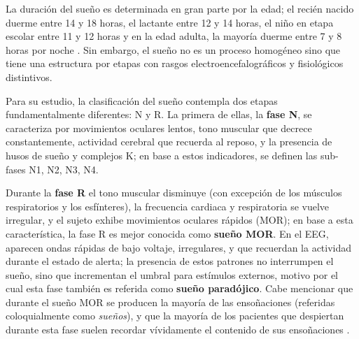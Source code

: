 La duración del sueño es determinada en gran parte por la edad; el recién nacido duerme entre 14 y 
18 horas, el lactante entre 12 y 14 horas, el niño en etapa escolar entre 11 y 12 horas y en la 
edad adulta, la mayoría duerme entre 7 y 8 horas por noche \cite{Contreras13}.
Sin embargo, el sueño no es un proceso homogéneo sino que tiene una estructura 
por etapas con rasgos electroencefalográficos y fisiológicos distintivos.

Para su estudio, la clasificación del sueño 
contempla dos etapas fundamentalmente diferentes: N y R.
La primera de ellas, la \textbf{fase N}, se caracteriza por movimientos oculares lentos, tono 
muscular que decrece constantemente, actividad cerebral que recuerda al reposo, y la presencia de
husos de sueño y complejos K; en base a estos indicadores, se definen las sub-fases N1, N2, N3, N4.
%

Durante la \textbf{fase R} el tono muscular disminuye (con excepción de los músculos respiratorios 
y los esfínteres), la frecuencia cardiaca y respiratoria se vuelve irregular, y el sujeto exhibe 
movimientos oculares rápidos (MOR); en base a esta característica, la fase R es mejor conocida 
como \textbf{sueño MOR}.
En el EEG, aparecen ondas rápidas de bajo voltaje, irregulares, y que recuerdan la actividad 
durante el estado de alerta; la presencia de estos patrones no interrumpen el sueño, sino que 
incrementan el umbral para estímulos externos, motivo por el cual esta fase también es referida como 
\textbf{sueño paradójico}.
%
Cabe mencionar que durante el sueño MOR se producen la mayoría de las ensoñaciones (referidas 
coloquialmente como \textit{sueños}), y que la mayoría de los pacientes que despiertan durante esta 
fase suelen recordar vívidamente el contenido de sus ensoñaciones 
\cite{Rosales14}.

